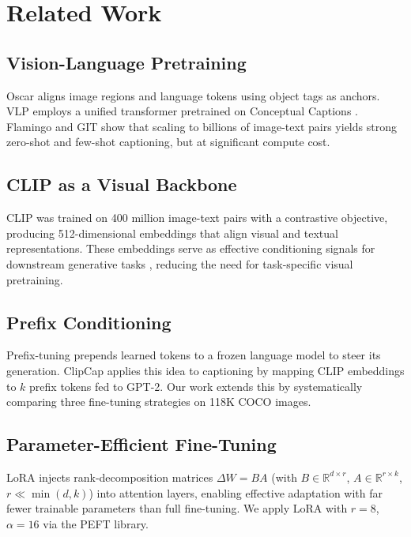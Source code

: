 \documentclass[conference]{IEEEtran}
\begin{document}
\section{Related Work}

\subsection{Vision-Language Pretraining}

Oscar \cite{li2020oscar} aligns image regions and language tokens using object tags as anchors. VLP \cite{zhou2020unified} employs a unified transformer pretrained on Conceptual Captions \cite{sharma2018conceptual}. Flamingo \cite{alayrac2022flamingo} and GIT \cite{wang2022git} show that scaling to billions of image-text pairs yields strong zero-shot and few-shot captioning, but at significant compute cost.

\subsection{CLIP as a Visual Backbone}

CLIP \cite{radford2021learning} was trained on 400 million image-text pairs with a contrastive objective, producing 512-dimensional embeddings that align visual and textual representations. These embeddings serve as effective conditioning signals for downstream generative tasks \cite{mokady2021clipcap}, reducing the need for task-specific visual pretraining.

\subsection{Prefix Conditioning}

Prefix-tuning \cite{li2021prefix} prepends learned tokens to a frozen language model to steer its generation. ClipCap \cite{mokady2021clipcap} applies this idea to captioning by mapping CLIP embeddings to $k$ prefix tokens fed to GPT-2. Our work extends this by systematically comparing three fine-tuning strategies on 118K COCO images.

\subsection{Parameter-Efficient Fine-Tuning}

LoRA \cite{hu2022lora} injects rank-decomposition matrices $\Delta W = BA$ (with $B \in \mathbb{R}^{d \times r}$, $A \in \mathbb{R}^{r \times k}$, $r \ll \min(d,k)$) into attention layers, enabling effective adaptation with far fewer trainable parameters than full fine-tuning. We apply LoRA with $r=8$, $\alpha=16$ via the PEFT library.
\end{document}
